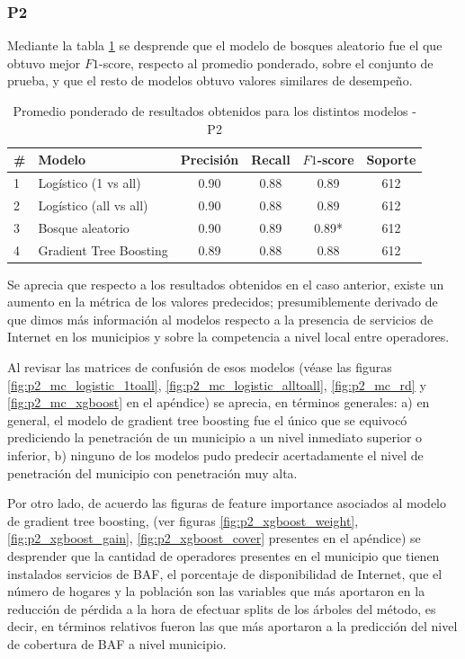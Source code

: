 \documentclass[9pt,twocolumn,twoside]{ilcss}
\begin{document}
\subsubsection{P2}

Mediante la tabla \ref{tab:p2_results} se desprende que el modelo de bosques aleatorio fue el que obtuvo mejor $F1$-score, respecto al promedio ponderado, sobre el conjunto de prueba, y que el resto de modelos obtuvo valores similares de desempeño.

\begin{table}[tbhp]
	\centering
	\caption{Promedio ponderado de resultados obtenidos para los distintos modelos - P2}
	\label{tab:p2_results}
	\begin{tabular}{@{}llcccc@{}}
		\toprule
		\# & Modelo & \multicolumn{1}{l}{Precisión} & \multicolumn{1}{l}{Recall} & \multicolumn{1}{l}{$F1$-score} & \multicolumn{1}{l}{Soporte} \\ \midrule
		1 & Logístico (1 vs all) & 0.90 & 0.88 & 0.89 & 612 \\
		2 & Logístico (all vs all) & 0.90 & 0.88 & 0.89 & 612 \\
		3 & Bosque aleatorio & 0.90 & 0.89 & 0.89* & 612 \\
		4 & Gradient Tree Boosting & 0.89 & 0.88 & 0.88 & 612 \\ \bottomrule
	\end{tabular}
\end{table}

Se aprecia que respecto a los resultados obtenidos en el caso anterior, existe un aumento en la métrica de los valores predecidos; presumiblemente derivado de que dimos más información al modelos respecto a la presencia de servicios de Internet en los municipios y sobre la competencia a nivel local entre operadores.

Al revisar las matrices de confusión de esos modelos (véase las figuras \ref{fig:p2_mc_logistic_1toall}, \ref{fig:p2_mc_logistic_alltoall}, \ref{fig:p2_mc_rd} y \ref{fig:p2_mc_xgboost} en el apéndice) se aprecia, en términos generales: a) en general, el modelo de gradient tree boosting fue el único que se equivocó prediciendo la penetración de un municipio a un nivel inmediato superior o inferior, b) ninguno de los modelos pudo predecir acertadamente el nivel de penetración del municipio con penetración muy alta.

Por otro lado, de acuerdo las figuras de feature importance asociados al modelo de gradient tree  boosting, (ver figuras \ref{fig:p2_xgboost_weight}, \ref{fig:p2_xgboost_gain}, \ref{fig:p2_xgboost_cover} presentes en el apéndice) se desprender que la cantidad de operadores presentes en el municipio que tienen instalados servicios de BAF, el porcentaje de disponibilidad de Internet, que el número de hogares y la población son las variables que más aportaron en la reducción de pérdida a la hora de efectuar splits de los árboles del método, es decir, en términos relativos fueron las que más aportaron a la predicción del nivel de cobertura de BAF a nivel municipio.
\end{document}
